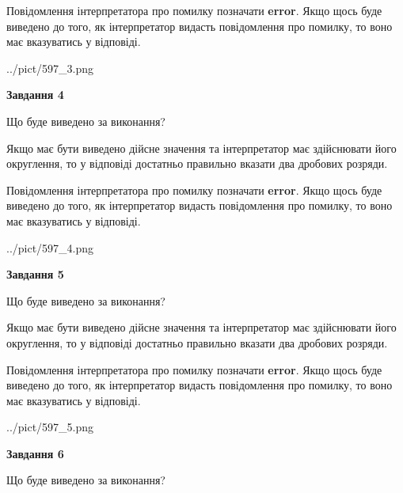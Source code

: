 \documentclass[12pt, ukrainian]{article}
\begin{document}
{\begin {Large}
Повідомлення інтерпретатора про помилку позначати \textbf{error}.
Якщо щось буде виведено до того, як інтерпретатор видасть повідомлення про помилку, 
то воно має вказуватись у відповіді. \par

\begin{center}
	{../pict/597_3.png}
\end{center}
\newpage

{\begin {center}\textbf{Завдання 4}\end {center}}\par
Що буде виведено за виконання? \par

Якщо має бути виведено дійсне значення та інтерпретатор має здійснювати його округлення, 
то у відповіді достатньо правильно вказати два дробових розряди.

Повідомлення інтерпретатора про помилку позначати \textbf{error}.
Якщо щось буде виведено до того, як інтерпретатор видасть повідомлення про помилку, 
то воно має вказуватись у відповіді. \par

\begin{center}
	{../pict/597_4.png}
\end{center}
\newpage

{\begin {center}\textbf{Завдання 5}\end {center}}\par
Що буде виведено за виконання? \par

Якщо має бути виведено дійсне значення та інтерпретатор має здійснювати його округлення, 
то у відповіді достатньо правильно вказати два дробових розряди.

Повідомлення інтерпретатора про помилку позначати \textbf{error}.
Якщо щось буде виведено до того, як інтерпретатор видасть повідомлення про помилку, 
то воно має вказуватись у відповіді. \par

\begin{center}
	{../pict/597_5.png}
\end{center}
\newpage

{\begin {center}\textbf{Завдання 6}\end {center}}\par
Що буде виведено за виконання? \par


\end{Large}}
\end{document}
